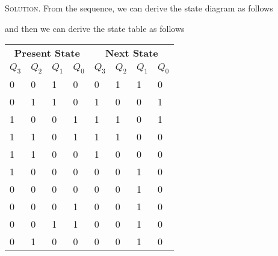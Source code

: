 \documentclass[12pt, a4paper, oneside]{article}
\newenvironment{solution}{\par\noindent\textsc{Solution. }}{\\\par}
\begin{document}
\begin{solution}
    From the sequence, we can derive the state diagram as follows
    \begin{figure}[!htbp]
        \centering
    \end{figure}
    \newline and then we can derive the state table as follows
    \begin{table}[!htbp]
        \centering
    \begin{tabular}{p{}<{\centering}p{}<{\centering}p{}<{\centering}p{}<{\centering}
        p{}<{\centering}p{}<{\centering}p{}<{\centering}p{}<{\centering}}
        \toprule
        \multicolumn{4}{c}{\textbf{Present State}} & \multicolumn{4}{c}{\textbf{Next State}} \\
        \cmidrule(lr){1-4}\cmidrule(lr){5-8}
        $Q_3$ & $Q_2$ & $Q_1$ & $Q_0$ & $Q_3$ & $Q_2$ & $Q_1$ & $Q_0$ \\
        \midrule
        0 & 0 & 1 & 0 & 0 & 1 & 1 & 0 \\
        0 & 1 & 1 & 0 & 1 & 0 & 0 & 1 \\
        1 & 0 & 0 & 1 & 1 & 1 & 0 & 1 \\
        1 & 1 & 0 & 1 & 1 & 1 & 0 & 0 \\
        1 & 1 & 0 & 0 & 1 & 0 & 0 & 0 \\
        1 & 0 & 0 & 0 & 0 & 0 & 1 & 0 \\
        0 & 0 & 0 & 0 & 0 & 0 & 1 & 0 \\
        0 & 0 & 0 & 1 & 0 & 0 & 1 & 0 \\
        0 & 0 & 1 & 1 & 0 & 0 & 1 & 0 \\
        0 & 1 & 0 & 0 & 0 & 0 & 1 & 0 \\

\end{tabular}
\end{table}
\end{solution}
\end{document}
